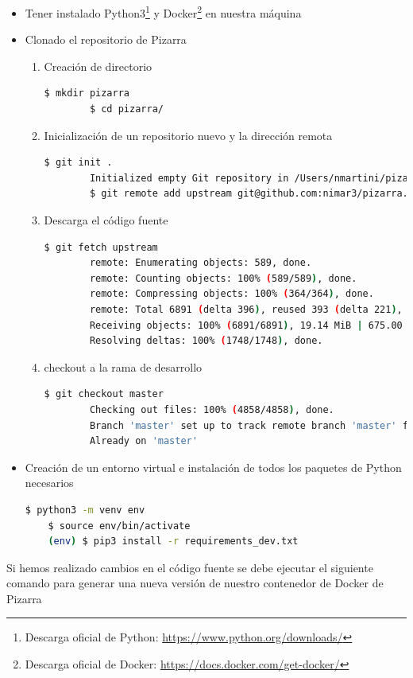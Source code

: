 \documentclass[11pt,spanish,listoffigures,listoftables]{tfgetsinf}
\begin{document}
\begin{itemize}
	\item  Tener instalado Python3\footnote{Descarga oficial de Python: \url{https://www.python.org/downloads/}} y Docker\footnote{Descarga oficial de Docker: \url{https://docs.docker.com/get-docker/}} en nuestra máquina
	\item Clonado el repositorio de Pizarra
	\begin{enumerate}
		\item Creación de directorio
		\begin{lstlisting}[language=bash]
		$ mkdir pizarra
		$ cd pizarra/
		\end{lstlisting}
		\item Inicialización de un repositorio nuevo y la dirección remota
		\begin{lstlisting}[language=bash]
		$ git init .
		Initialized empty Git repository in /Users/nmartini/pizarra/.git/
		$ git remote add upstream git@github.com:nimar3/pizarra.git
		\end{lstlisting}
		\item Descarga el código fuente
		\begin{lstlisting}[language=bash]
		$ git fetch upstream
		remote: Enumerating objects: 589, done.
		remote: Counting objects: 100% (589/589), done.
		remote: Compressing objects: 100% (364/364), done.
		remote: Total 6891 (delta 396), reused 393 (delta 221), pack-reused 6302
		Receiving objects: 100% (6891/6891), 19.14 MiB | 675.00 KiB/s, done.
		Resolving deltas: 100% (1748/1748), done.
		\end{lstlisting}
		\item \foreignlanguage{english}{checkout} a la rama de desarrollo
		\begin{lstlisting}[language=bash]
		$ git checkout master
		Checking out files: 100% (4858/4858), done.
		Branch 'master' set up to track remote branch 'master' from 'upstream'.
		Already on 'master'
		\end{lstlisting}
	\end{enumerate}
	\item Creación de un entorno virtual e instalación de todos los \Gls{paquete}s de Python necesarios
	\begin{lstlisting}[language=bash]
	$ python3 -m venv env
	$ source env/bin/activate   
	(env) $ pip3 install -r requirements_dev.txt
	\end{lstlisting}
\end{itemize}

Si hemos realizado cambios en el código fuente se debe ejecutar el siguiente comando para generar una nueva versión de nuestro \Gls{contenedor} de Docker de Pizarra
\end{document}
